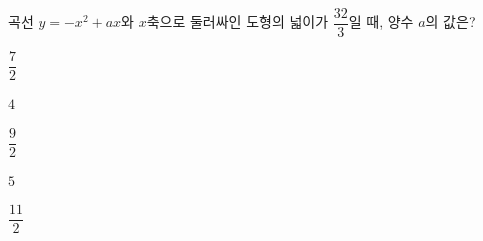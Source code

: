 곡선 $y=-x^2+ax$와 $x$축으로 둘러싸인 도형의 넓이가 $\dfrac{32}{3}$일 때, 양수 $a$의 값은?
\begin{choices32}{\rule[-3ex]{0pt}{8ex}$\dfrac{7}{2}$}{\rule[-3ex]{0pt}{8ex}$4$}{\rule[-3ex]{0pt}{8ex}$\dfrac{9}{2}$}{\rule[-3ex]{0pt}{8ex}$5$}{\rule[-3ex]{0pt}{8ex}$\dfrac{11}{2}$}\end{choices32}
